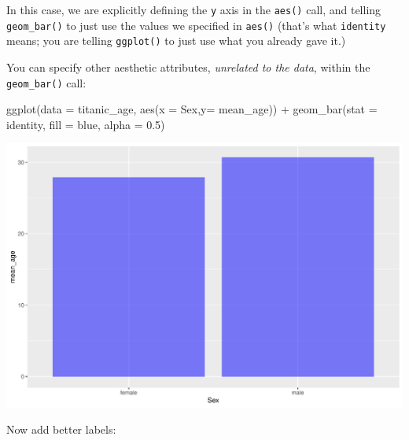 \documentclass[
]{book}
\newenvironment{Shaded}{\begin{snugshade}}{\end{snugshade}}
\newcommand{\AttributeTok}[1]{\textcolor[rgb]{0.77,0.63,0.00}{#1}}
\newcommand{\FloatTok}[1]{\textcolor[rgb]{0.00,0.00,0.81}{#1}}
\newcommand{\FunctionTok}[1]{\textcolor[rgb]{0.00,0.00,0.00}{#1}}
\newcommand{\NormalTok}[1]{#1}
\newcommand{\SpecialCharTok}[1]{\textcolor[rgb]{0.00,0.00,0.00}{#1}}
\newcommand{\StringTok}[1]{\textcolor[rgb]{0.31,0.60,0.02}{#1}}
\begin{document}
In this case, we are explicitly defining the \texttt{y} axis in the \texttt{aes()} call, and telling \texttt{geom\_bar()} to just use the values we specified in \texttt{aes()} (that's what \texttt{\textquotesingle{}identity\textquotesingle{}} means; you are telling \texttt{ggplot()} to just use what you already gave it.)

You can specify other aesthetic attributes, \emph{unrelated to the data}, within the \texttt{geom\_bar()} call:

\begin{Shaded}
\begin{Highlighting}[]
\FunctionTok{ggplot}\NormalTok{(}\AttributeTok{data =}\NormalTok{ titanic\_age, }
       \FunctionTok{aes}\NormalTok{(}\AttributeTok{x =}\NormalTok{ Sex,}\AttributeTok{y=}\NormalTok{ mean\_age)) }\SpecialCharTok{+} 
  \FunctionTok{geom\_bar}\NormalTok{(}\AttributeTok{stat =} \StringTok{\textquotesingle{}identity\textquotesingle{}}\NormalTok{, }\AttributeTok{fill =} \StringTok{\textquotesingle{}blue\textquotesingle{}}\NormalTok{, }\AttributeTok{alpha =} \FloatTok{0.5}\NormalTok{) }
\end{Highlighting}
\end{Shaded}

\includegraphics[width=694.08px]{figures/unnamed-chunk-167-1}

Now add better labels:
\end{document}
